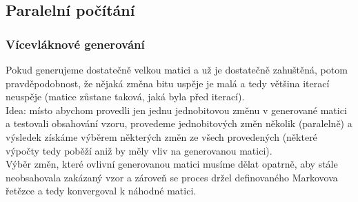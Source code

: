 \documentclass{beamer}
\begin{document}
\subsection{Paralelní počítání}
\begin{frame}
\frametitle{Vícevláknové generování}
Pokud generujeme dostatečně velkou matici a už je dostatečně zahuštěná, potom pravděpodobnost, že nějaká změna bitu uspěje je malá a tedy většina iterací neuspěje (matice zůstane taková, jaká byla před iterací).\\
\vspace{1em}
 Idea: místo abychom provedli jen jednu jednobitovou změnu v generované matici a testovali obsahování vzoru, provedeme jednobitových změn několik (paralelně) a výsledek získáme \alert<3>{výběrem některých změn} ze všech provedených (některé výpočty tedy poběží aniž by měly vliv na generovanou matici).\\
\vspace{1em}
 Výběr změn, které ovlivní generovanou matici musíme dělat opatrně, aby stále neobsahovala zakázaný vzor a zároveň se proces držel definovaného Markovova řetězce a tedy konvergoval k náhodné matici.
\end{frame}

\end{document}

